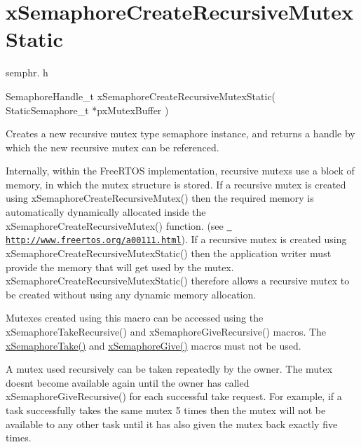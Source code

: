 \hypertarget{group__x_semaphore_create_recursive_mutex_static}{}\section{x\+Semaphore\+Create\+Recursive\+Mutex\+Static}
\label{group__x_semaphore_create_recursive_mutex_static}
semphr. h 
\begin{DoxyPre}SemaphoreHandle\_t xSemaphoreCreateRecursiveMutexStatic( StaticSemaphore\_t *pxMutexBuffer )\end{DoxyPre}


Creates a new recursive mutex type semaphore instance, and returns a handle by which the new recursive mutex can be referenced.

Internally, within the Free\+R\+T\+OS implementation, recursive mutexs use a block of memory, in which the mutex structure is stored. If a recursive mutex is created using x\+Semaphore\+Create\+Recursive\+Mutex() then the required memory is automatically dynamically allocated inside the x\+Semaphore\+Create\+Recursive\+Mutex() function. (see \href{http://www.freertos.org/a00111.html}{\texttt{ http\+://www.\+freertos.\+org/a00111.\+html}}). If a recursive mutex is created using x\+Semaphore\+Create\+Recursive\+Mutex\+Static() then the application writer must provide the memory that will get used by the mutex. x\+Semaphore\+Create\+Recursive\+Mutex\+Static() therefore allows a recursive mutex to be created without using any dynamic memory allocation.

Mutexes created using this macro can be accessed using the x\+Semaphore\+Take\+Recursive() and x\+Semaphore\+Give\+Recursive() macros. The \mbox{\hyperlink{semphr_8h_af116e436d2a5ae5bd72dbade2b5ea930}{x\+Semaphore\+Take()}} and \mbox{\hyperlink{semphr_8h_aae55761cabfa9bf85c8f4430f78c0953}{x\+Semaphore\+Give()}} macros must not be used.

A mutex used recursively can be \textquotesingle{}taken\textquotesingle{} repeatedly by the owner. The mutex doesn\textquotesingle{}t become available again until the owner has called x\+Semaphore\+Give\+Recursive() for each successful \textquotesingle{}take\textquotesingle{} request. For example, if a task successfully \textquotesingle{}takes\textquotesingle{} the same mutex 5 times then the mutex will not be available to any other task until it has also \textquotesingle{}given\textquotesingle{} the mutex back exactly five times.

